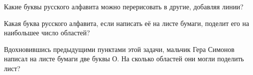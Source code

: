 ﻿
\begin{itemize}

\itA Какие буквы русского алфавита можно перерисовать в другие, добавляя линии?

\itB Какая буква русского алфавита, если написать её на листе бумаги, поделит его на наибольшее число областей?

\itC Вдохновившись предыдущими пунктами этой задачи, мальчик Гера Симонов написал на листе бумаги две буквы О. На сколько областей они могли поделить лист?
\end{itemize}